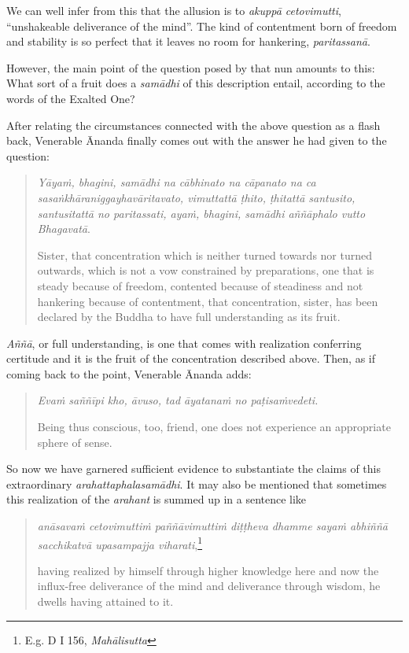 We can well infer from this that the allusion is to \emph{akuppā cetovimutti}, ``unshakeable deliverance of the mind''. The kind of contentment born of freedom and stability is so perfect that it leaves no room for hankering, \emph{paritassanā}.

However, the main point of the question posed by that nun amounts to this: What sort of a fruit does a \emph{samādhi} of this description entail, according to the words of the Exalted One?

After relating the circumstances connected with the above question as a flash back, Venerable Ānanda finally comes out with the answer he had given to the question:

\begin{quote}
\emph{Yāyaṁ, bhagini, samādhi na cābhinato na cāpanato na ca sasaṅkhāraniggayhavāritavato, vimuttattā ṭhito, ṭhitattā santusito, santusitattā no paritassati, ayaṁ, bhagini, samādhi aññāphalo vutto Bhagavatā}.

Sister, that concentration which is neither turned towards nor turned outwards, which is not a vow constrained by preparations, one that is steady because of freedom, contented because of steadiness and not hankering because of contentment, that concentration, sister, has been declared by the Buddha to have full understanding as its fruit.
\end{quote}

\emph{Aññā}, or full understanding, is one that comes with realization conferring certitude and it is the fruit of the concentration described above. Then, as if coming back to the point, Venerable Ānanda adds:

\begin{quote}
\emph{Evaṁ saññīpi kho, āvuso, tad āyatanaṁ no paṭisaṁvedeti.}

Being thus conscious, too, friend, one does not experience an appropriate sphere of sense.
\end{quote}

So now we have garnered sufficient evidence to substantiate the claims of this extraordinary \emph{arahattaphalasamādhi}. It may also be mentioned that sometimes this realization of the \emph{arahant} is summed up in a sentence like

\begin{quote}
\emph{anāsavaṁ cetovimuttiṁ paññāvimuttiṁ diṭṭheva dhamme sayaṁ abhiññā sacchikatvā upasampajja viharati},\footnote{E.g. D I 156, \emph{Mahālisutta}}

having realized by himself through higher knowledge here and now the influx-free deliverance of the mind and deliverance through wisdom, he dwells having attained to it.
\end{quote}

